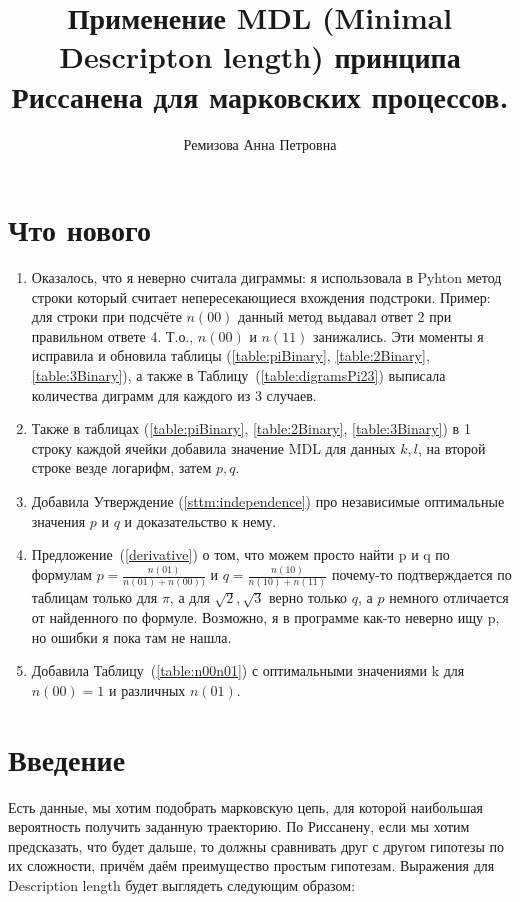 \documentclass[12pt]{article}
\begin{document}
	\title{Применение MDL (Minimal Descripton length) принципа Риссанена для марковских процессов.}
	\author{Ремизова Анна Петровна}
	\maketitle
	
	\section*{Что нового}
	\begin{enumerate}
		\item Оказалось, что я неверно считала диграммы: я использовала в Pyhton метод строки  который считает непересекающиеся вхождения подстроки. Пример: для строки  при подсчёте $n(00)$ данный метод выдавал ответ 2 при правильном ответе 4. Т.о., $n(00)$ и $n(11)$ занижались. Эти моменты я исправила и обновила таблицы (\ref{table:piBinary}, \ref{table:2Binary}, \ref{table:3Binary}), а также в Таблицу~(\ref{table:digramsPi23}) выписала количества диграмм для каждого из 3 случаев.
		\item Также в таблицах (\ref{table:piBinary}, \ref{table:2Binary}, \ref{table:3Binary}) в 1 строку каждой ячейки добавила значение MDL для данных $k, l$, на второй строке везде логарифм, затем $p, q$.
		\item Добавила Утверждение (\ref{sttm:independence}) про независимые оптимальные значения $p$ и $q$ и доказательство к нему.
		\item Предложение~(\ref{derivative}) о том, что можем просто найти p и q по формулам $p = \frac{n(01)}{n(01)+n(00))}$ и $q = \frac{n(10)}{n(10)+n(11)}$ почему-то подтверждается по таблицам только для $\pi$, а для $\sqrt{2},\sqrt{3}$ верно только $q$, а $p$ немного отличается от найденного по формуле. Возможно, я в программе как-то неверно ищу p, но ошибки я пока там не нашла.
		\item Добавила Таблицу~(\ref{table:n00n01}) с оптимальными значениями k для $n(00)=1$ и различных $n(01)$. 
	\end{enumerate}
	
	\section*{Введение}
	 Есть данные, мы хотим подобрать марковскую цепь, для которой наибольшая вероятность получить заданную траекторию. По Риссанену, если мы хотим предсказать, что будет дальше, то должны сравнивать друг с другом гипотезы по их сложности, причём даём преимущество простым гипотезам. Выражения для Description length будет выглядеть следующим образом:
	
\end{document}
